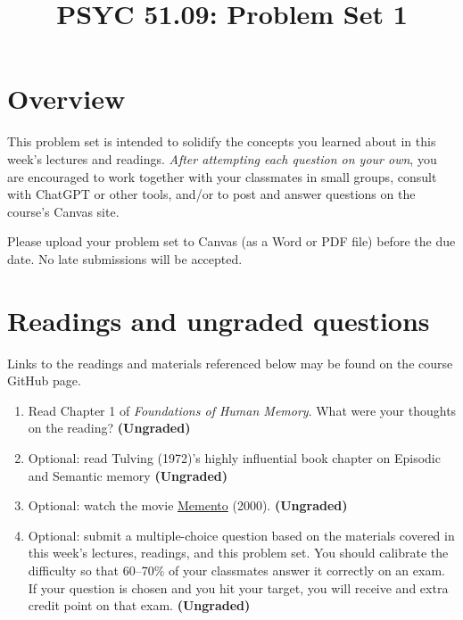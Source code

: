 \documentclass[11pt]{article}
\title{PSYC 51.09: Problem Set 1}
\date{}
\begin{document}
\maketitle
\vspace{-0.75in}
\section*{Overview}

This problem set is intended to solidify the concepts you learned about in this
week's lectures and readings. \textit{After attempting each question on your
own}, you are encouraged to work together with your classmates in small groups,
consult with ChatGPT or other tools, and/or to post and answer questions on the
course’s Canvas site.

Please upload your problem set to Canvas (as a Word or PDF file)
before the due date.  No late submissions will be accepted.

\section*{Readings and ungraded questions}

Links to the readings and materials referenced below may be found on the course GitHub page.
\begin{enumerate}
\item Read Chapter 1 of \textit{Foundations of Human Memory}.  What were your thoughts on the reading?
  \textbf{(Ungraded)}

\item Optional: read Tulving (1972)'s highly influential book chapter
  on Episodic and Semantic memory
  \textbf{(Ungraded)}

\item Optional: watch the movie \underline{Memento} (2000).  \textbf{(Ungraded)}

\item Optional: submit a multiple-choice question based on the materials
covered in this week's lectures, readings, and this problem set. You should
calibrate the difficulty so that 60--70\% of your classmates answer it
correctly on an exam.  If your question is chosen and you hit your target,
you will receive and extra credit point on that exam.  \textbf{(Ungraded)}

\end{enumerate}
\end{document}
